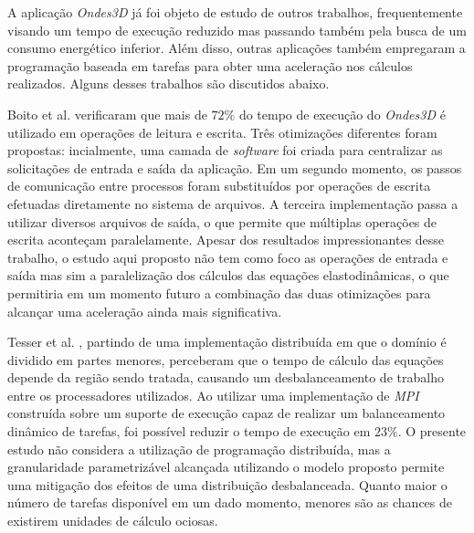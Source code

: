 \documentclass[cic,tc]{iiufrgs}
\begin{document}
A aplicação \textit{Ondes3D} já foi objeto de estudo de outros trabalhos, frequentemente visando um tempo de execução reduzido mas passando também pela busca de um consumo energético 
inferior. Além disso, outras aplicações também empregaram a programação baseada em tarefas para obter uma aceleração nos cálculos realizados. Alguns desses trabalhos são discutidos abaixo.

Boito et al. \cite{boito} verificaram que mais de $72\%$ do tempo de execução do \textit{Ondes3D} é utilizado em operações de leitura e escrita. Três otimizações diferentes foram
propostas: incialmente, uma camada de \textit{software} foi criada para centralizar as solicitações de entrada e saída da aplicação. Em um segundo momento, os passos de comunicação entre
processos foram substituídos por operações de escrita efetuadas diretamente no sistema de arquivos. A terceira implementação passa a utilizar diversos arquivos de saída, o que permite que
múltiplas operações de escrita aconteçam paralelamente. Apesar dos resultados impressionantes desse trabalho, o estudo aqui proposto não tem como foco as operações de entrada e saída mas
sim a paralelização dos cálculos das equações elastodinâmicas, o que permitiria em um momento futuro a combinação das duas otimizações para alcançar uma aceleração ainda mais significativa.

Tesser et al. \cite{dupros:hal-00797682}, partindo de uma implementação distribuída em que o domínio é dividido em partes menores, perceberam que o tempo de cálculo das equações
depende da região sendo tratada, causando um desbalanceamento de trabalho entre os processadores utilizados. Ao utilizar uma implementação de \textit{MPI} construída sobre um suporte
de execução capaz de realizar um balanceamento dinâmico de tarefas, foi possível reduzir o tempo de execução em $23\%$. O presente estudo não considera a utilização de programação
distribuída, mas a granularidade parametrizável alcançada utilizando o modelo proposto permite uma mitigação dos efeitos de uma distribuição desbalanceada. Quanto maior o número de tarefas
disponível em um dado momento, menores são as chances de existirem unidades de cálculo ociosas.
\end{document}
